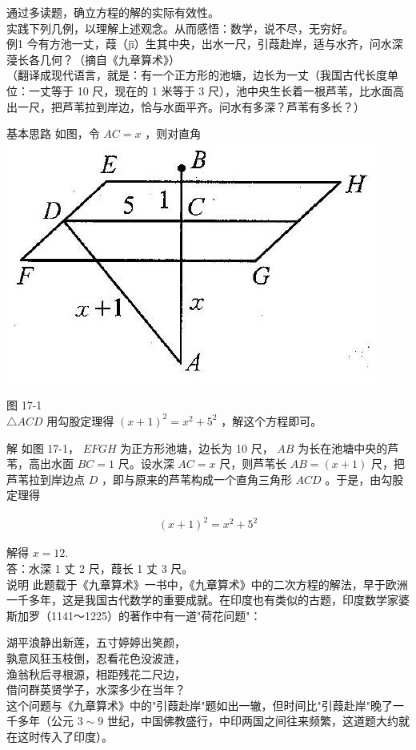 \documentclass[10pt]{article}
\begin{document}
通过多读题，确立方程的解的实际有效性。\\
实践下列几例，以理解上述观念。从而感悟：数学，说不尽，无穷好。\\
例1 今有方池一丈，葭（jī̄）生其中央，出水一尺，引葭赴岸，适与水齐，问水深蓡长各几何？（摘自《九章算术》）\\
（翻译成现代语言，就是：有一个正方形的池塘，边长为一丈（我国古代长度单位：一丈等于 10 尺，现在的 1 米等于 3 尺），池中央生长着一根芦苇，比水面高出一尺，把芦苇拉到岸边，恰与水面平齐。问水有多深？芦苇有多长？）

基本思路 如图，令 $A C=x$ ，则对直角\\
\includegraphics[max width=\textwidth, center]{2024_10_30_26b590fd1106d28139f0g-109}

图 17-1\\
$\triangle A C D$ 用勾股定理得 $(x+1)^{2}=x^{2}+5^{2}$ ，解这个方程即可。

解 如图 17-1， $E F G H$ 为正方形池塘，边长为 10 尺， $A B$ 为长在池塘中央的芦苇，高出水面 $B C=1$ 尺。设水深 $A C=x$ 尺，则芦苇长 $A B=(x+1)$ 尺，把芦苇拉到岸边点 $D$ ，即与原来的芦苇构成一个直角三角形 $A C D$ 。于是，由勾股定理得

\begin{align*}
(x+1)^{2}=x^{2}+5^{2}
\end{align*}

解得 $x=12$.\\
答：水深 1 丈 2 尺，葭长 1 丈 3 尺。\\
说明 此题载于《九章算术》一书中，《九章算术》中的二次方程的解法，早于欧洲一千多年，这是我国古代数学的重要成就。在印度也有类似的古题，印度数学家婆斯加罗（1141～1225）的著作中有一道"荷花问题"：

湖平浪静出新莲，五寸婷婷出笑颜，\\
孰意风狂玉枝倒，忍看花色没波涟，\\
渔翁秋后寻根源，相距残花二尺边，\\
借问群英贤学子，水深多少在当年？\\
这个问题与《九章算术》中的"引葭赴岸"题如出一辙，但时间比"引葭赴岸"晚了一千多年（公元 $3 \sim 9$ 世纪，中国佛教盛行，中印两国之间往来频繁，这道题大约就在这时传入了印度）。
\end{document}
